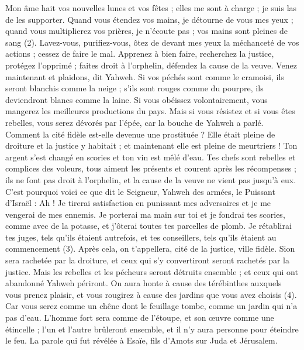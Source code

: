 \begin{multicols}{2}
Mon âme hait vos nouvelles lunes et vos fêtes ; elles me sont à charge ; je suis las de les supporter.
Quand vous étendez vos mains, je détourne de vous mes yeux ; quand vous multiplierez vos prières, je n’écoute pas ; vos mains sont pleines de sang (2).
Lavez-vous, purifiez-vous, ôtez de devant mes yeux la méchanceté de vos actions ; cessez de faire le mal.
Apprenez à bien faire, recherchez la justice, protégez l’opprimé ; faites droit à l'orphelin, défendez la cause de la veuve.
Venez maintenant et plaidons, dit Yahweh. Si vos péchés sont comme le cramoisi, ils seront blanchis comme la neige ; s’ils sont rouges comme du pourpre, ils deviendront blancs comme la laine.
Si vous obéissez volontairement, vous mangerez les meilleures productions du pays.
Mais si vous résistez et si vous êtes rebelles, vous serez dévorés par l'épée, car la bouche de Yahweh a parlé.
Comment la cité fidèle est-elle devenue une prostituée ? Elle était pleine de droiture et la justice y habitait ; et maintenant elle est pleine de meurtriers !
Ton argent s’est changé en scories et ton vin est mêlé d'eau.
Tes chefs sont rebelles et complices des voleurs, tous aiment les présents et courent après les récompenses ; ils ne font pas droit à l'orphelin, et la cause de la veuve ne vient pas jusqu’à eux.
C'est pourquoi voici ce que dit le Seigneur, Yahweh des armées, le Puissant d'Israël : Ah ! Je tirerai satisfaction en punissant mes adversaires et je me vengerai de mes ennemis.
Je porterai ma main sur toi et je fondrai tes scories, comme avec de la potasse, et j'ôterai toutes tes parcelles de plomb.
Je rétablirai tes juges, tels qu'ils étaient autrefois, et tes conseillers, tels qu’ils étaient au commencement (3). Après cela, on t'appellera, cité de la justice, ville fidèle.
Sion sera rachetée par la droiture, et ceux qui s’y convertiront seront rachetés par la justice.
Mais les rebelles et les pécheurs seront détruits ensemble ; et ceux qui ont abandonné Yahweh périront.
On aura honte à cause des térébinthes auxquels vous prenez plaisir, et vous rougirez à cause des jardins que vous avez choisis (4).
Car vous serez comme un chêne dont le feuillage tombe, comme un jardin qui n'a pas d'eau.
L’homme fort sera comme de l'étoupe, et son œuvre comme une étincelle ; l’un et l’autre brûleront ensemble, et il n'y aura personne pour éteindre le feu.
\VerseOne{}La parole qui fut révélée à Esaïe, fils d'Amots sur Juda et Jérusalem.

\end{multicols}
